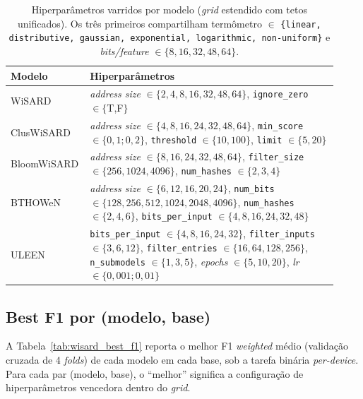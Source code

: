 \begin{table}[ht]
  \centering
  \caption{Hiperparâmetros varridos por modelo (\emph{grid} estendido
           com tetos unificados). Os três primeiros compartilham
           termômetro $\in$ \texttt{\{linear, distributive, gaussian,
           exponential, logarithmic, non-uniform\}} e
           \emph{bits/feature} $\in \{8, 16, 32, 48, 64\}$.}
  \label{tab:wisard_grids}
  \small
  \begin{tabular}{p{0.18\linewidth} p{0.74\linewidth}}
    \toprule
    \textbf{Modelo} & \textbf{Hiperparâmetros} \\
    \midrule
    WiSARD       & \emph{address size} $\in \{2,4,8,16,32,48,64\}$, \texttt{ignore\_zero} $\in \{$T,F$\}$ \\
    ClusWiSARD   & \emph{address size} $\in \{4,8,16,24,32,48,64\}$, \texttt{min\_score} $\in \{0{,}1; 0{,}2\}$, \texttt{threshold} $\in \{10,100\}$, \texttt{limit} $\in \{5,20\}$ \\
    BloomWiSARD  & \emph{address size} $\in \{8,16,24,32,48,64\}$, \texttt{filter\_size} $\in \{256,1024,4096\}$, \texttt{num\_hashes} $\in \{2,3,4\}$ \\
    BTHOWeN      & \emph{address size} $\in \{6,12,16,20,24\}$, \texttt{num\_bits} $\in \{128,256,512,1024,2048,4096\}$, \texttt{num\_hashes} $\in \{2,4,6\}$, \texttt{bits\_per\_input} $\in \{4,8,16,24,32,48\}$ \\
    ULEEN        & \texttt{bits\_per\_input} $\in \{4,8,16,24,32\}$, \texttt{filter\_inputs} $\in \{3,6,12\}$, \texttt{filter\_entries} $\in \{16,64,128,256\}$, \texttt{n\_submodels} $\in \{1,3,5\}$, \emph{epochs} $\in \{5,10,20\}$, \emph{lr} $\in \{0{,}001; 0{,}01\}$ \\
    \bottomrule
  \end{tabular}
\end{table}

\subsection{Best F1 por (modelo, base)}

A Tabela~\ref{tab:wisard_best_f1} reporta o melhor F1 \emph{weighted}
médio (validação cruzada de 4 \emph{folds}) de cada modelo em cada
base, sob a tarefa binária \emph{per-device}. Para cada par (modelo,
base), o ``melhor'' significa a configuração de hiperparâmetros
vencedora dentro do \emph{grid}.

